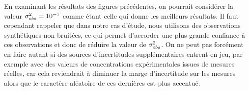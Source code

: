 En examinant les résultats des figures précédentes, on pourrait considérer la valeur ${\sigma_{obs}^2} = 10^{-7}$ comme étant celle qui donne les meilleurs résultats. Il faut cependant rappeler que dans notre cas d'étude, nous utilisons des observations synthétiques non-bruitées, ce qui permet d'accorder une plus grande confiance à ces observations et donc de réduire la valeur de ${\sigma_{obs}^2}$. On ne peut pas forcément en faire autant si des sources d'incertitudes supplémentaires entrent en jeu, par exemple avec des valeurs de concentrations expérimentales issues de mesures réelles, car cela reviendrait à diminuer la marge d'incertitude sur les mesures alors que le caractère aléatoire de ces dernières est plus accentué. 
%
%
%

